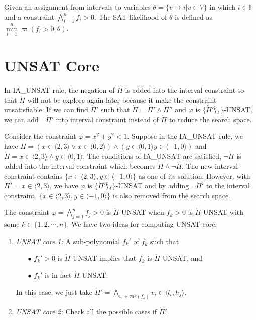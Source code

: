 \begin{definition}
Given an assignment from intervals to variables ${\theta = \{v \mapsto i | v \in V\}}$ in which $i \in \mathbb{I}$ and a constraint $\bigwedge\limits_{i = 1}^nf_i > 0$. The SAT-likelihood of $\theta$ is defined as ${\min\limits_{i = 1}^n \varpi(f_i > 0, \theta)}$.
\end{definition}

\section{UNSAT Core}
In \tiny IA\_UNSAT \normalsize rule, the negation of $\mathring\Pi$ is added into the interval constraint so that $\mathring\Pi$ will not be explore again later because it make the constraint unsatisfiable. If we can find $\mathring\Pi'$ such that $\mathring\Pi = \mathring\Pi' \wedge \mathring\Pi''$ and $\varphi$ is $\{\mathring\Pi'^p_{IA}\}$-UNSAT, we can add $\neg\mathring\Pi'$ into interval constraint instead of $\mathring\Pi$ to reduce the search space.

\begin{example}
Consider the constraint $\varphi = x^2 + y^2 < 1$. Suppose in the \tiny IA\_UNSAT \normalsize rule, we have $\Pi = (x \in \langle 2, 3 \rangle \vee x \in \langle 0, 2 \rangle) \wedge (y \in \langle 0, 1 \rangle y \in \langle -1, 0 \rangle)$ and $\mathring\Pi = x \in \langle 2, 3 \rangle \wedge y \in \langle 0, 1 \rangle$. The conditions of \tiny IA\_UNSAT \normalsize are satisfied, $\neg \mathring\Pi$ is added into the interval constraint which becomes $\Pi \wedge \neg \mathring\Pi$. The new interval constraint contains $\{x \in \langle 2, 3 \rangle, y \in \langle -1, 0 \rangle\}$ as one of its solution. However, with $\mathring\Pi' = x \in \langle 2, 3 \rangle$, we have $\varphi$ is $\{\mathring\Pi'^p_{IA}\}$-UNSAT and by adding $\neg\mathring\Pi'$ to the interval constraint, $\{x \in \langle 2, 3 \rangle, y \in \langle -1, 0 \rangle\}$ is also removed from the search space.
\end{example}

The constraint $\varphi = \bigwedge\limits_{j=1}^n f_j > 0$ is $\mathring\Pi$-UNSAT when $f_k > 0$ is $\mathring\Pi$-UNSAT with some $k \in \{1, 2, \cdots, n\}$. We have two ideas for computing UNSAT core.
\begin{enumerate}
\item \emph{UNSAT core 1:} A sub-polynomial $f_k'$ of $f_k$ such that
\begin{itemize}
\item[$\bullet$] $f_k' > 0$ is $\mathring\Pi$-UNSAT implies that $f_k$ is $\mathring\Pi$-UNSAT, and
\item[$\bullet$] $f_k'$ is in fact $\mathring\Pi$-UNSAT.
\end{itemize} 
In this case, we just take $\mathring\Pi' = \bigwedge\limits_{v_i \in var(f_k)}v_i \in \langle l_i, h_j \rangle$.
\item \emph{UNSAT core 2:} Check all the possible cases if $\mathring\Pi'$.
\end{enumerate}

